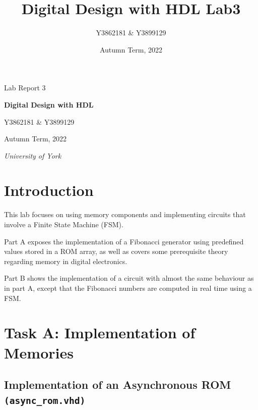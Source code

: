 \documentclass[10pt]{article}
\title{Digital Design with HDL Lab3}
\author{Y3862181 \& Y3899129}
\date{Autumn Term, 2022}
\begin{document}
\begin{titlepage}
\centering
{\Huge Lab Report 3}

\vspace{3cm}

{\LARGE \textbf{Digital Design with HDL}}

\vspace{3cm}

{\huge Y3862181 \& Y3899129}

\vspace{2cm}


{\large Autumn Term, 2022}
\vfill

{\itshape University of York}
\end{titlepage}

\tableofcontents
\newpage

\pagestyle{content}
\section{Introduction}
This lab focuses on using memory components and implementing circuits that involve a Finite State Machine (FSM).

Part A exposes the implementation of a Fibonacci generator using predefined values stored in a ROM array, as well as covers some prerequisite theory regarding memory in digital electronics.

Part B shows the implementation of a circuit with almost the same behaviour as in part A, except that the Fibonacci numbers are computed in real time using a FSM.

\newpage


\section{Task A: Implementation of Memories}

\subsection{Implementation of an Asynchronous ROM \texttt{(async\_rom.vhd)}}
\end{document}
